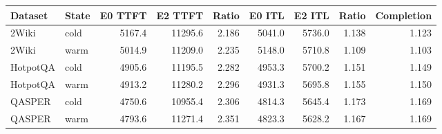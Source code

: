 \begin{tabular}{llrrrrrrr}
\toprule
Dataset & State & E0 TTFT & E2 TTFT & Ratio & E0 ITL & E2 ITL & Ratio & Completion \\
\midrule
2Wiki & cold & 5167.4 & 11295.6 & 2.186 & 5041.0 & 5736.0 & 1.138 & 1.123 \\
2Wiki & warm & 5014.9 & 11209.0 & 2.235 & 5148.0 & 5710.8 & 1.109 & 1.103 \\
HotpotQA & cold & 4905.6 & 11195.5 & 2.282 & 4953.3 & 5700.2 & 1.151 & 1.149 \\
HotpotQA & warm & 4913.2 & 11280.2 & 2.296 & 4931.3 & 5695.8 & 1.155 & 1.150 \\
QASPER & cold & 4750.6 & 10955.4 & 2.306 & 4814.3 & 5645.4 & 1.173 & 1.169 \\
QASPER & warm & 4793.6 & 11271.4 & 2.351 & 4823.3 & 5628.2 & 1.167 & 1.169 \\
\bottomrule
\end{tabular}
